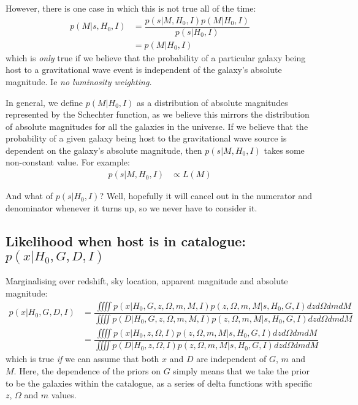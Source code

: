 \documentclass[a4paper,10pt]{article}
\begin{document}
However, there is one case in which this is not true all of the time:
\begin{equation}
\begin{aligned}
p(M|s,H_0,I) &= \dfrac{p(s|M,H_0,I)p(M|H_0,I)}{p(s|H_0,I)} 
\\ &= p(M|H_0,I)
\end{aligned}
\end{equation}
which is \emph{only} true if we believe that the probability of a particular galaxy being host to a gravitational wave event is independent of the galaxy's absolute magnitude. Ie \emph{no luminosity weighting.}

In general, we define $p(M|H_0,I)$ as a distribution of absolute magnitudes represented by the Schechter function, as we believe this mirrors the distribution of absolute magnitudes for all the galaxies in the universe.  If we believe that the probability of a given galaxy being host to the gravitational wave source is dependent on the galaxy's absolute magnitude, then $p(s|M,H_0,I)$ takes some non-constant value.  For example:
\begin{equation}
\begin{aligned}
p(s|M,H_0,I) &\propto L(M)
\end{aligned}
\end{equation}

And what of $p(s|H_0,I)$?  Well, hopefully it will cancel out in the numerator and denominator whenever it turns up, so we never have to consider it.





\subsection{Likelihood when host is in catalogue: $p(x|H_0,G,D,I)$}


Marginalising over redshift, sky location, apparent magnitude and absolute magnitude:
\begin{equation}
\begin{aligned}
p(x|H_0,G,D,I) &= \dfrac{\iiiint p(x|H_0,G,z,\Omega,m,M,I) p(z,\Omega,m,M|s,H_0,G,I) dz d\Omega dm dM}{\iiiint p(D|H_0,G,z,\Omega,m,M,I) p(z,\Omega,m,M|s,H_0,G,I) dz d\Omega dm dM}
\\ &= \dfrac{\iiiint p(x|H_0,z,\Omega,I) p(z,\Omega,m,M|s,H_0,G,I) dz d\Omega dm dM}{\iiiint p(D|H_0,z,\Omega,I) p(z,\Omega,m,M|s,H_0,G,I) dz d\Omega dm dM}
\end{aligned}
\end{equation}
which is true \emph{if} we can assume that both $x$ and $D$ are independent of $G$, $m$ and $M$.  Here, the dependence of the priors on $G$ simply means that we take the prior to be the galaxies within the catalogue, as a series of delta functions with specific $z$, $\Omega$ and $m$ values.
\end{document}
